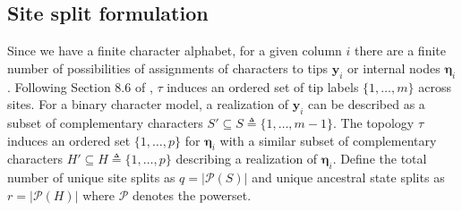 \documentclass[a4paper]{article}
\newcommand{\alignmentColumn}{\mathbf{y}}
\newcommand{\siteSplit}{S'}
\newcommand{\sitePatternSet}{S}
\newcommand{\ancestralStateColumn}{\boldsymbol\eta}
\newcommand{\ancestralSplit}{H'}
\newcommand{\ancestralStateSet}{H}
\newcommand{\nSiteRows}{m}
\newcommand{\nAncestralStateRows}{p}
\newcommand{\nSiteSplits}{q}
\newcommand{\nAncestralSplits}{r}
\begin{document}
\subsection{Site split formulation}

Since we have a finite character alphabet, for a given column $i$ there are a finite number of possibilities of assignments of characters to tips $\alignmentColumn_i$ or internal nodes $\ancestralStateColumn_i$.
Following Section 8.6 of \cite{Semple2003}, $\tau$ induces an ordered set of tip labels $\{1,\ldots,\nSiteRows\}$ across sites.
For a binary character model, a realization of $\alignmentColumn_i$ can be described as a subset of complementary characters $\siteSplit\subseteq\sitePatternSet\triangleq\{1,\ldots,\nSiteRows-1\}$.
The topology $\tau$ induces an ordered set $\{1,\ldots,\nAncestralStateRows\}$ for $\ancestralStateColumn_i$ with a similar subset of complementary characters $\ancestralSplit\subseteq\ancestralStateSet\triangleq\{1,\ldots,\nAncestralStateRows\}$ describing a realization of $\ancestralStateColumn_i$.
Define the total number of unique site splits as $\nSiteSplits=|\mathcal{P}(\sitePatternSet)|$ and unique ancestral state splits as $\nAncestralSplits=|\mathcal{P}(\ancestralStateSet)|$ where $\mathcal{P}$ denotes the powerset.

\end{document}
